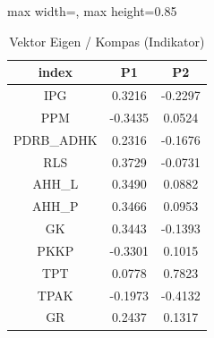\begin{table}[H]
\centering
\caption{Vektor Eigen / Kompas (Indikator)} \label{tab:appv_s}
\begin{adjustbox}{max width=\textwidth, max height=0.85\textheight}
\begin{tabular}{|c|c|c|}
\hline
\textbf{index} & \textbf{P1} & \textbf{P2} \\
\hline
IPG & 0.3216 & -0.2297 \\
PPM & -0.3435 & 0.0524 \\
PDRB\_ADHK & 0.2316 & -0.1676 \\
RLS & 0.3729 & -0.0731 \\
AHH\_L & 0.3490 & 0.0882 \\
AHH\_P & 0.3466 & 0.0953 \\
GK & 0.3443 & -0.1393 \\
PKKP & -0.3301 & 0.1015 \\
TPT & 0.0778 & 0.7823 \\
TPAK & -0.1973 & -0.4132 \\
GR & 0.2437 & 0.1317 \\
\hline
\end{tabular}
\end{adjustbox}
\end{table}